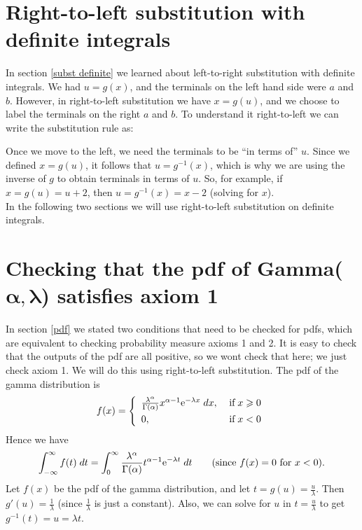 \section{Right-to-left substitution with definite integrals}
In section \ref{subst definite} we learned about left-to-right substitution with definite integrals. We had $u = g(x)$, and the terminals on the left hand side were $a$ and $b$. However, in right-to-left substitution we have $x = g(u)$, and we choose to label the terminals on the right $a$ and $b$. To understand it right-to-left we can write the substitution rule as:
\begin{center}
\end{center}
Once we move to the left, we need the terminals to be ``in terms of'' $u$. Since we defined $x = g(u)$, it follows that $u = g^{-1}(x)$, which is why we are using the inverse of $g$ to obtain terminals in terms of $u$. So, for example, if $x = g(u) = u + 2$, then $u = g^{-1}(x) = x - 2$ (solving for $x$). \\

\noindent In the following two sections we will use right-to-left substitution on definite integrals.
\section{Checking that the pdf of Gamma($\boldsymbol{\alpha,
\lambda}$) satisfies axiom 1} \label{gamma axiom 1}
In section \ref{pdf} we stated two conditions that need to be checked for pdfs, which are equivalent to checking probability measure axioms 1 and 2. It is easy to check that the outputs of the pdf are all positive, so we wont check that here; we just check axiom 1. We will do this using right-to-left substitution. The pdf of the gamma distribution is
\[
f(x) = \left\{ \begin{array}{ll}
\frac{\lambda^\alpha}{\Gamma(\alpha)}x^{\alpha - 1}\e^{-\lambda x} \; dx, & \; \text{if} \; x \geq 0 \smallskip \\
0, & \; \text{if} \; x < 0
\end{array}
\right.
\]
Hence we have
\[
\int_{-\infty}^\infty f(t) \; dt = \int_{0}^\infty \frac{\lambda^\alpha}{\Gamma(\alpha)}t^{\alpha - 1}\mathrm{e}^{-\lambda t} \; dt \tag{since $f(x) = 0$ for $x < 0$}.
\]
Let $f(x)$ be the pdf of the gamma distribution, and let $t = g(u) = \frac{u}{\lambda}$. Then $g'(u) = \frac{1}{\lambda}$ (since $\frac{1}{\lambda}$ is just a constant). Also, we can solve for $u$ in $t = \frac{u}{\lambda}$ to get $g^{-1}(t) = u = \lambda t$. \\

